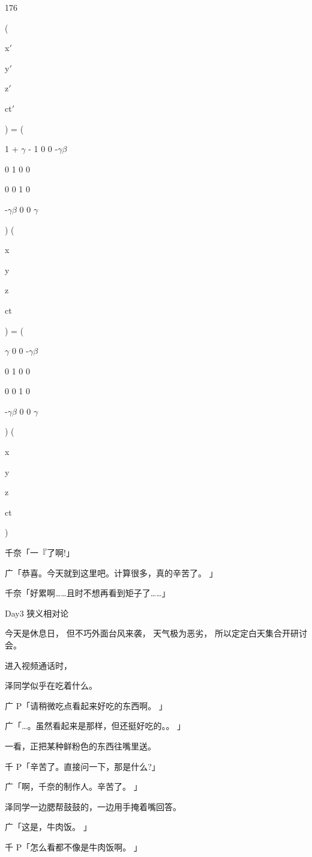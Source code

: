 176\par
(\par
x$\prime$\par
y$\prime$\par
z$\prime$\par
ct$\prime$\par
) = (\par
1 + $\gamma$ - 1 0 0 -$\gamma$$\beta$\par
0 1 0 0\par
0 0 1 0\par
-$\gamma$$\beta$ 0 0 $\gamma$\par
) (\par
x\par
y\par
z\par
ct\par
) = (\par
$\gamma$ 0 0 -$\gamma$$\beta$\par
0 1 0 0\par
0 0 1 0\par
-$\gamma$$\beta$ 0 0 $\gamma$\par
) (\par
x\par
y\par
z\par
ct\par
)\par
千奈「一『了啊!」\par
广「恭喜。今天就到这里吧。计算很多，真的辛苦了。 」\par
千奈「好累啊……且时不想再看到矩子了……」\par
Day3 狭义相对论\par
今天是休息日， 但不巧外面台风来袭， 天气极为恶劣， 所以定定白天集合开研讨会。\par
进入视频通话时，\par
泽同学似乎在吃着什么。\par
广 P「请稍微吃点看起来好吃的东西啊。 」\par
广「…。虽然看起来是那样，但还挺好吃的。。 」\par
一看，正把某种鲜粉色的东西往嘴里送。\par
千 P「辛苦了。直接问一下，那是什么?」\par
广「啊，千奈的制作人。辛苦了。 」\par
泽同学一边腮帮鼓鼓的，一边用手掩着嘴回答。\par
广「这是，牛肉饭。 」\par
千 P「怎么看都不像是牛肉饭啊。 」\par
